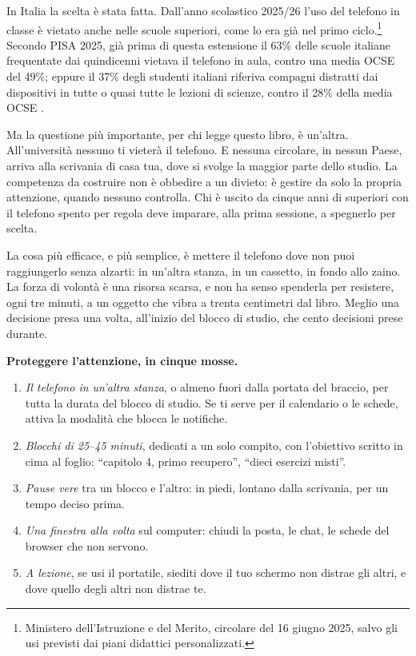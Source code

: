 In Italia la scelta è stata fatta. Dall'anno scolastico 2025/26 l'uso
del telefono in classe è vietato anche nelle scuole superiori, come lo
era già nel primo ciclo.\footnote{Ministero dell'Istruzione e del
Merito, circolare del 16 giugno 2025, salvo gli usi previsti dai piani
didattici personalizzati.} Secondo PISA 2025, già prima di questa
estensione il 63\% delle scuole italiane frequentate dai quindicenni
vietava il telefono in aula, contro una media OCSE del 49\%; eppure il
37\% degli studenti italiani riferiva compagni distratti dai dispositivi
in tutte o quasi tutte le lezioni di scienze, contro il 28\% della media OCSE
\parencite{oecd2026pisa}.

Ma la questione più importante, per chi legge questo libro, è un'altra.
All'università nessuno ti vieterà il telefono. E nessuna circolare, in
nessun Paese, arriva alla scrivania di casa tua, dove si svolge la
maggior parte dello studio. La competenza da costruire non è obbedire
a un divieto: è gestire da solo la propria attenzione, quando nessuno
controlla. Chi è uscito da cinque anni di superiori con il telefono
spento per regola deve imparare, alla prima sessione, a spegnerlo per
scelta.

La cosa più efficace, e più semplice, è mettere il telefono dove non
puoi raggiungerlo senza alzarti: in un'altra stanza, in un cassetto, in
fondo allo zaino. La forza di volontà è una risorsa scarsa, e non ha
senso spenderla per resistere, ogni tre minuti, a un oggetto che vibra
a trenta centimetri dal libro. Meglio una decisione presa una volta,
all'inizio del blocco di studio, che cento decisioni prese durante.

\begin{inpratica}
\textbf{Proteggere l'attenzione, in cinque mosse.}
\begin{enumerate}
  \item \emph{Il telefono in un'altra stanza}, o almeno fuori dalla
        portata del braccio, per tutta la durata del blocco di studio.
        Se ti serve per il calendario o le schede, attiva la modalità
        che blocca le notifiche.
  \item \emph{Blocchi di 25--45 minuti}, dedicati a un solo compito,
        con l'obiettivo scritto in cima al foglio: \enquote{capitolo 4,
        primo recupero}, \enquote{dieci esercizi misti}.
  \item \emph{Pause vere} tra un blocco e l'altro: in piedi, lontano
        dalla scrivania, per un tempo deciso prima.
  \item \emph{Una finestra alla volta} sul computer: chiudi la posta,
        le chat, le schede del browser che non servono.
  \item \emph{A lezione}, se usi il portatile, siediti dove il tuo
        schermo non distrae gli altri, e dove quello degli altri non
        distrae te.
\end{enumerate}
\end{inpratica}

